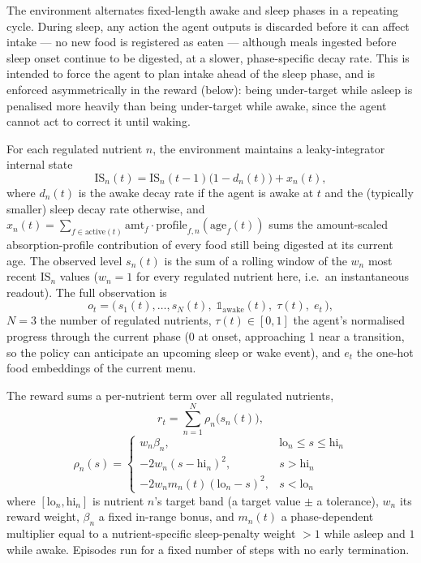\documentclass[10pt,twocolumn]{article}
\begin{document}
The environment alternates fixed-length awake and sleep phases in a repeating cycle. During sleep, any action the agent outputs is discarded before it can affect intake — no new food is registered as eaten — although meals ingested before sleep onset continue to be digested, at a slower, phase-specific decay rate. This is intended to force the agent to plan intake ahead of the sleep phase, and is enforced asymmetrically in the reward (below): being under-target while asleep is penalised more heavily than being under-target while awake, since the agent cannot act to correct it until waking.

For each regulated nutrient $n$, the environment maintains a leaky-integrator internal state
\begin{equation}
\text{IS}_n(t) = \text{IS}_n(t-1)\big(1-d_n(t)\big) + x_n(t),
\label{eq:leaky-integrator}
\end{equation}
where $d_n(t)$ is the awake decay rate if the agent is awake at $t$ and the (typically smaller) sleep decay rate otherwise, and $x_n(t)=\sum_{f\in\text{active}(t)}\text{amt}_f\cdot\text{profile}_{f,n}(\text{age}_f(t))$ sums the amount-scaled absorption-profile contribution of every food still being digested at its current age. The observed level $s_n(t)$ is the sum of a rolling window of the $w_n$ most recent $\text{IS}_n$ values ($w_n{=}1$ for every regulated nutrient here, i.e.\ an instantaneous readout). The full observation is
\begin{equation}
o_t = \big(\, s_1(t),\dots,s_N(t),\; \mathbb{1}_{\text{awake}}(t),\; \tau(t),\; e_t \,\big),
\label{eq:obs}
\end{equation}
$N{=}3$ the number of regulated nutrients, $\tau(t)\in[0,1]$ the agent's normalised progress through the current phase (0 at onset, approaching 1 near a transition, so the policy can anticipate an upcoming sleep or wake event), and $e_t$ the one-hot food embeddings of the current menu.

The reward sums a per-nutrient term over all regulated nutrients,
\begin{equation}
r_t = \sum_{n=1}^{N} \rho_n\big(s_n(t)\big),
\label{eq:reward-sum}
\end{equation}
\begin{equation}
\rho_n(s) =
\begin{cases}
w_n\beta_n, & \text{lo}_n\!\le\! s \!\le\!\text{hi}_n \\[2pt]
-2w_n(s-\text{hi}_n)^2, & s>\text{hi}_n \\[2pt]
-2w_n m_n(t)(\text{lo}_n-s)^2, & s<\text{lo}_n
\end{cases}
\label{eq:reward}
\end{equation}
where $[\text{lo}_n,\text{hi}_n]$ is nutrient $n$'s target band (a target value $\pm$ a tolerance), $w_n$ its reward weight, $\beta_n$ a fixed in-range bonus, and $m_n(t)$ a phase-dependent multiplier equal to a nutrient-specific sleep-penalty weight $>\!1$ while asleep and $1$ while awake. Episodes run for a fixed number of steps with no early termination.
\end{document}
